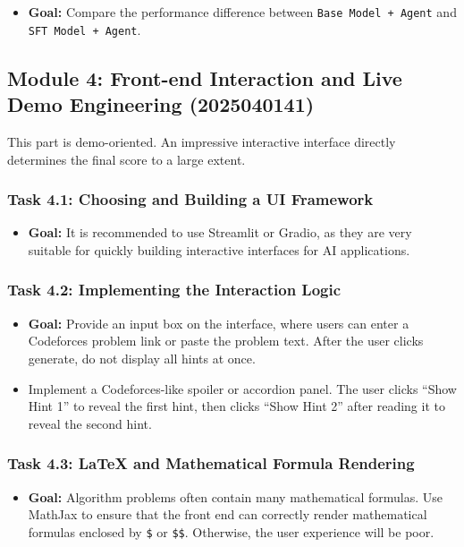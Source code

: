\documentclass{article}
\begin{document}
\begin{itemize}
    \item \textbf{Goal:} Compare the performance difference between \texttt{Base Model + Agent} and \texttt{SFT Model + Agent}.
\end{itemize}

\subsection*{Module 4: Front-end Interaction and Live Demo Engineering (2025040141)}

This part is demo-oriented. An impressive interactive interface directly determines the final score to a large extent.

\subsubsection*{Task 4.1: Choosing and Building a UI Framework}

\begin{itemize}
    \item \textbf{Goal:} It is recommended to use Streamlit or Gradio, as they are very suitable for quickly building interactive interfaces for AI applications.
\end{itemize}

\subsubsection*{Task 4.2: Implementing the Interaction Logic}

\begin{itemize}
    \item \textbf{Goal:} Provide an input box on the interface, where users can enter a Codeforces problem link or paste the problem text. After the user clicks generate, do not display all hints at once.
    \item Implement a Codeforces-like spoiler or accordion panel. The user clicks ``Show Hint 1'' to reveal the first hint, then clicks ``Show Hint 2'' after reading it to reveal the second hint.
\end{itemize}

\subsubsection*{Task 4.3: LaTeX and Mathematical Formula Rendering}

\begin{itemize}
    \item \textbf{Goal:} Algorithm problems often contain many mathematical formulas. Use MathJax to ensure that the front end can correctly render mathematical formulas enclosed by \texttt{\$} or \texttt{\$\$}. Otherwise, the user experience will be poor.
\end{itemize}
\end{document}
